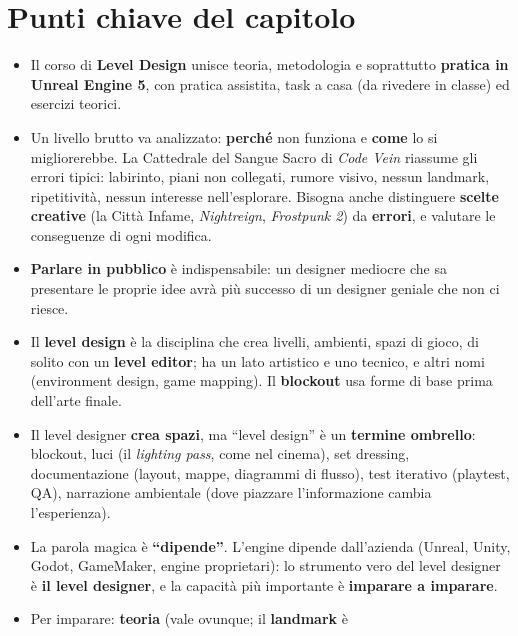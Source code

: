 \section*{Punti chiave del capitolo}

\begin{itemize}
  \item Il corso di \textbf{Level Design} unisce teoria, metodologia e
        soprattutto \textbf{pratica in Unreal Engine 5}, con pratica assistita,
        task a casa (da rivedere in classe) ed esercizi teorici.
  \item Un livello brutto va analizzato: \textbf{perché} non funziona e
        \textbf{come} lo si migliorerebbe. La Cattedrale del Sangue Sacro di
        \emph{Code Vein} riassume gli errori tipici: labirinto, piani non
        collegati, rumore visivo, nessun landmark, ripetitività, nessun
        interesse nell'esplorare. Bisogna anche distinguere
        \textbf{scelte creative} (la Città Infame, \emph{Nightreign},
        \emph{Frostpunk 2}) da \textbf{errori}, e valutare le conseguenze di
        ogni modifica.
  \item \textbf{Parlare in pubblico} è indispensabile: un designer mediocre
        che sa presentare le proprie idee avrà più successo di un designer
        geniale che non ci riesce.
  \item Il \textbf{level design} è la disciplina che crea livelli, ambienti,
        spazi di gioco, di solito con un \textbf{level editor}; ha un lato
        artistico e uno tecnico, e altri nomi (environment design, game
        mapping). Il \textbf{blockout} usa forme di base prima dell'arte
        finale.
  \item Il level designer \textbf{crea spazi}, ma ``level design'' è un
        \textbf{termine ombrello}: blockout, luci (il \emph{lighting pass},
        come nel cinema), set dressing, documentazione (layout, mappe,
        diagrammi di flusso), test iterativo (playtest, QA), narrazione
        ambientale (dove piazzare l'informazione cambia l'esperienza).
  \item La parola magica è \textbf{``dipende''}. L'engine dipende
        dall'azienda (Unreal, Unity, Godot, GameMaker, engine proprietari):
        lo strumento vero del level designer è \textbf{il level designer},
        e la capacità più importante è \textbf{imparare a imparare}.
  \item Per imparare: \textbf{teoria} (vale ovunque; il \textbf{landmark} è

\end{itemize}

